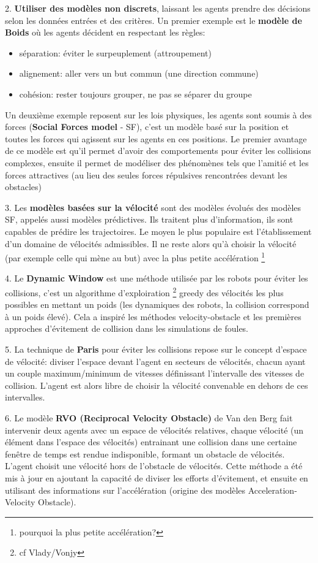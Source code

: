 \documentclass[11pt]{report}
\begin{document}
2. \textbf{Utiliser des modèles non discrets}, laissant les agents prendre des décisions selon les données entrées et des critères. Un premier exemple est le \textbf{modèle de Boids} où les agents décident en respectant les règles:
\begin{itemize}
	\item séparation: éviter le surpeuplement (attroupement)
	\item alignement: aller vers un but commun (une direction commune)
	\item cohésion: rester toujours grouper, ne pas se séparer du groupe
\end{itemize}
Un deuxième exemple reposent sur les lois physiques, les agents sont soumis à des forces (\textbf{Social Forces model} - SF), c'est un modèle basé sur la position et toutes les forces qui agissent sur les agents en ces positions. Le premier avantage de ce modèle est qu'il permet d'avoir des comportements pour éviter les collisions complexes, ensuite il permet de modéliser des phénomènes tels que l'amitié et les forces attractives (au lieu des seules forces répulsives rencontrées devant les obstacles)

3. Les \textbf{modèles basées sur la vélocité} sont des modèles évolués des modèles SF, appelés aussi modèles prédictives. Ils traitent plus d'information, ils sont capables de prédire les trajectoires. Le moyen le plus populaire est l'établissement d'un domaine de vélocités admissibles. Il ne reste alors qu'à choisir la vélocité (par exemple celle qui mène au but) avec la plus petite accélération \footnote{pourquoi la plus petite accélération?}

4. Le \textbf{Dynamic Window} est une méthode utilisée par les robots pour éviter les collisions, c'est un algorithme d'exploiration \footnote{cf Vlady/Vonjy} greedy des vélocités les plus possibles en mettant un poids (les dynamiques des robots, la collision correspond à un poids élevé). Cela a inspiré les méthodes velocity-obstacle et les premières approches d'évitement de collision dans les simulations de foules.

5. La technique de \textbf{Paris} pour éviter les collisions repose sur le concept d'espace de vélocité: diviser l'espace devant l'agent en secteurs de vélocités, chacun ayant un couple maximum/minimum de vitesses définissant l'intervalle des vitesses de collision. L'agent est alors libre de choisir la vélocité convenable en dehors de ces intervalles.

6. Le modèle \textbf{RVO (Reciprocal Velocity Obstacle)} de Van den Berg  fait intervenir deux agents  avec un espace de vélocités relatives, chaque vélocité (un élément dans l'espace des vélocités) entrainant une collision dans une certaine fenêtre de temps est rendue indisponible, formant un obstacle de vélocités. L'agent choisit une vélocité hors de l'obstacle de vélocités. Cette méthode a été mis à jour en ajoutant la capacité de diviser les efforts d'évitement, et ensuite en utilisant des informations sur l'accélération (origine des modèles Acceleration-Velocity Obstacle).
\end{document}
